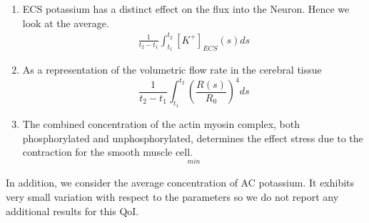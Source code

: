 \begin{enumerate}
\item ECS potassium has a distinct effect on the flux into the Neuron. Hence we look at the average.
\begin{eqnarray}
 \frac{1}{t_2-t_1}\int_{t_1}^{t_2}[K^+]_{ECS}(s)ds \label{K_ECS_Mean}
\end{eqnarray}

\item As a representation of the volumetric flow rate in the cerebral tissue
\begin{equation}
\frac{1}{t_2-t_1}\int_{t_1}^{t_2}\left(\frac{R(s)}{R_0}\right)^4ds \label{vol_flow}
\end{equation}
 
\item The combined concentration of the actin myosin complex, both phosphorylated and unphosphorylated, determines the effect stress due to the contraction for the smooth muscle cell. 
\begin{eqnarray}
[AM+AM_p]_{min} \label{AM_AMp_Min}
\end{eqnarray}

\end{enumerate}

In addition, we consider the average concentration of AC potassium. It exhibits very small variation with respect to the parameters so we do not report any additional results for this QoI.

